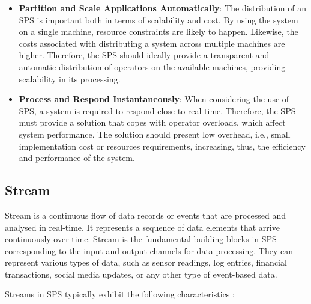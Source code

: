 \begin{itemize}
		\item \textbf{Partition and Scale Applications Automatically}: The distribution of an SPS is important both in terms of scalability and cost. By using the system on a single machine, resource constraints are likely to happen. Likewise, the costs associated with distributing a system across multiple machines are higher. Therefore, the SPS should ideally provide a transparent and automatic distribution of operators on the available machines, providing scalability in its processing.
       \item \textbf{Process and Respond Instantaneously}: When considering the use of SPS, a system is required to respond close to real-time. Therefore, the SPS must provide a solution that copes with operator overloads, which affect system performance. The solution should present low overhead, i.e., small implementation cost or resources requirements, increasing, thus, the efficiency and performance of the system.
\end{itemize}

\subsection{Stream}

Stream is a continuous flow of data records or events that are processed and analysed in real-time. It represents a sequence of data elements that arrive continuously over time. Stream is the fundamental building blocks in SPS corresponding to the input and output channels for data processing. They can represent various types of data, such as sensor readings, log entries, financial transactions, social media updates, or any other type of event-based data.

Streams in SPS typically exhibit the following characteristics \citep{SilvaFBHCG13}:

